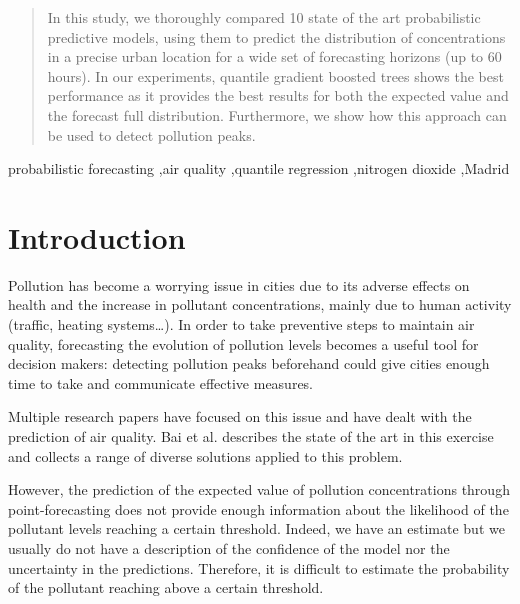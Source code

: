 \documentclass[a4paper,3p,sort&compress]{elsarticle}
\begin{document}
\begin{frontmatter}
\begin{abstract}
  In this study, we thoroughly compared 10 state of the art probabilistic
  predictive models, using them to predict the distribution of \no
  concentrations in a precise urban location for a wide set of forecasting
  horizons (up to 60 hours). In our experiments, quantile gradient boosted trees
  shows the best performance as it provides the best results for both the
  expected value and the forecast full distribution. Furthermore, we show how
  this approach can be used to detect pollution peaks.%
\end{abstract}

\begin{keyword}
probabilistic forecasting \sep air quality \sep quantile regression
\sep nitrogen dioxide \sep Madrid
\end{keyword}

\end{frontmatter}


\section{Introduction }
\label{sec:intro}

Pollution has become a worrying issue in cities due to its adverse
effects on health and the increase in pollutant concentrations, mainly
due to human activity (traffic, heating systems\ldots). In order to
take preventive steps to maintain air quality, forecasting the
evolution of pollution levels becomes a useful tool for decision
makers: detecting pollution peaks beforehand could give cities enough
time to take and communicate effective measures.

Multiple research papers have focused on this issue and have dealt
with the prediction of air quality. Bai et al. \cite{bai_air_2018}
describes the state of the art in this exercise and collects a range
of diverse solutions applied to this problem.

However, the prediction of the expected value of pollution
concentrations through point-forecasting does not provide enough
information about the likelihood of the pollutant levels reaching a
certain threshold. Indeed, we have an estimate but we usually do not
have a description of the confidence of the model nor the uncertainty
in the predictions. Therefore, it is difficult to estimate the
probability of the pollutant reaching above a certain threshold.
\end{document}
